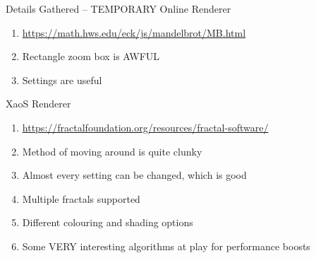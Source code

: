 \begin{redbox}{Details Gathered -- TEMPORARY}
	Online Renderer
	\begin{enumerate}
		\item {	\href{https://math.hws.edu/eck/js/mandelbrot/MB.html}{https://math.hws.edu/eck/js/mandelbrot/MB.html} }
		\item { Rectangle zoom box is AWFUL }
		\item { Settings are useful }
	\end{enumerate}
	
	XaoS Renderer
	\begin{enumerate}
		\item {	\href{https://fractalfoundation.org/resources/fractal-software/}{https://fractalfoundation.org/resources/fractal-software/} }
		\item { Method of moving around is quite clunky }
		\item { Almost every setting can be changed, which is good }
		\item { Multiple fractals supported }
		\item { Different colouring and shading options }
		\item { Some VERY interesting algorithms at play for performance boosts }
		
		
		
		
		
	\end{enumerate}
	
\end{redbox}
